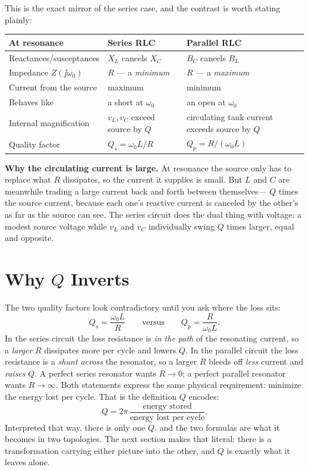 This is the exact mirror of the series case, and the contrast is worth stating
plainly:
\begin{center}
\begin{tabularx}{\textwidth}{@{}L{0.26\textwidth}Y Y@{}}
\toprule
At resonance & Series RLC & Parallel RLC \\
\midrule
Reactances/susceptances & \(X_L\) cancels \(X_C\) & \(B_C\) cancels \(B_L\) \\
Impedance \(Z(\jj\omega_0)\) & \(R\) --- a \emph{minimum} & \(R\) --- a \emph{maximum} \\
Current from the source & maximum & minimum \\
Behaves like & a short at \(\omega_0\) & an open at \(\omega_0\) \\
Internal magnification & \(v_L,v_C\) exceed source by \(Q\) & circulating tank current exceeds source by \(Q\) \\
Quality factor & \(Q_s=\omega_0 L/R\) & \(Q_p=R/(\omega_0 L)\) \\
\bottomrule
\end{tabularx}
\end{center}

\begin{physicalbox}
\textbf{Why the circulating current is large.} At resonance the source only has to
replace what \(R\) dissipates, so the current it supplies is small. But \(L\) and
\(C\) are meanwhile trading a large current back and forth between themselves---
\(Q\) times the source current, because each one's reactive current is canceled by
the other's as far as the source can see. The series circuit does the dual thing
with voltage: a modest source voltage while \(v_L\) and \(v_C\) individually swing
\(Q\) times larger, equal and opposite.
\end{physicalbox}

\cite[pp.~62--67]{white2004highfrequency}

\section{Why \texorpdfstring{\(Q\)}{Q} Inverts}
The two quality factors look contradictory until you ask where the loss sits:
\[
Q_s=\frac{\omega_0 L}{R}
\qquad\text{versus}\qquad
Q_p=\frac{R}{\omega_0 L} .
\]
In the series circuit the loss resistance is \emph{in the path} of the resonating
current, so a \emph{larger} \(R\) dissipates more per cycle and lowers \(Q\). In
the parallel circuit the loss resistance is a \emph{shunt across} the resonator, so
a larger \(R\) bleeds off \emph{less} current and \emph{raises} \(Q\). A perfect
series resonator wants \(R\to0\); a perfect parallel resonator wants
\(R\to\infty\). Both statements express the same physical requirement: minimize the
energy lost per cycle. That is the definition \(Q\) encodes:
\[
Q=2\pi\,\frac{\text{energy stored}}{\text{energy lost per cycle}} .
\]
Interpreted that way, there is only one \(Q\), and the two formulas are what it becomes in
two topologies. The next section makes that literal: there is a transformation
carrying either picture into the other, and \(Q\) is exactly what it leaves alone.

